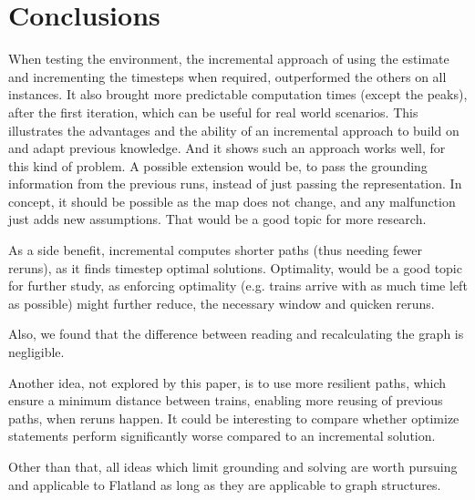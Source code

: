 \section{Conclusions}

When testing the environment, the incremental approach of using the estimate and incrementing the timesteps when required, outperformed the others on all instances. It also brought more predictable computation times (except the peaks), after the first iteration, which can be useful for real world scenarios. This illustrates the advantages and the ability of an incremental approach to build on and adapt previous knowledge. And it shows such an approach works well, for this kind of problem. A possible extension would be, to pass the grounding information from the previous runs, instead of just passing the representation. In concept, it should be possible as the map does not change, and any malfunction just adds new assumptions. That would be a good topic for more research.

As a side benefit, incremental computes shorter paths (thus needing fewer reruns), as it finds timestep optimal solutions. Optimality, would be a good topic for further study, as enforcing optimality (e.g. trains arrive with as much time left as possible) might further reduce, the necessary window and quicken reruns.

Also, we found that the difference between reading and recalculating the graph is negligible.

Another idea, not explored by this paper, is to use more resilient paths, which ensure a minimum distance between trains, enabling more reusing of previous paths, when reruns happen. It could be interesting to compare whether optimize statements perform significantly worse compared to an incremental solution.

Other than that, all ideas which limit grounding and solving are worth pursuing and applicable to Flatland as long as they are applicable to graph structures.